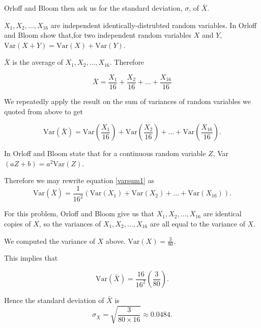 \documentclass[a4paper,11pt]{article}
\begin{document}
Orloff and Bloom then ask us for the
standard deviation, $\sigma$, of
$\bar{X}$.

$X_1, X_2, \ldots, X_16$ are independent identically-distrubted random
variables.  In \cite{reading6b} Orloff and Bloom show that,for two independent
random variables $X$ and $Y$, $\text{Var}\left( X + Y \right) =
\text{Var}\left( X \right) + \text{Var}\left( Y \right)$.

$\bar{X}$ is the average of $X_1, X_2, \ldots, X_16$.  Therefore

\begin{equation}
\bar{X} = \frac{X_1}{16} + \frac{X_2}{16} + \ldots + \frac{X_16}{16}
\end{equation}

We repeatedly apply the result on the sum of variances of random variables
we quoted from \cite{reading6b} above to get

\begin{equation} \label{varsum1}
\text{Var}\left(\bar{X}\right) = \text{Var}\left(\frac{X_1}{16}\right)
 + \text{Var}\left(\frac{X_2}{16}\right) + \ldots +
 \text{Var}\left(\frac{X_16}{16}\right).
\end{equation}

In \cite{reading6a} Orloff and Bloom state that for
a continuous random variable $Z$,
Var$\left(aZ + b \right)=a^2\text{Var}\left(Z\right)$.

Therefore we may rewrite equation \ref{varsum1} as
\begin{equation} \label{varsum2}
\text{Var}\left(\bar{X}\right) = \frac{1}{16^2}\left(\text{Var}\left(X_1\right)
 + \text{Var}\left(X_2\right) + \ldots +
 \text{Var}\left(X_16\right)\right).
\end{equation}

For this problem, Orloff and Bloom give us that
$X_1 , X_2 , \ldots , X_16$ are identical copies
of $X$, so the variances of $X_1 , X_2 , \ldots , X_16$
are all equal to the variance of $X$.

We computed the variance of $X$ above.
$\text{Var}\left(X \right)=\frac{3}{80}$.

This implies that

\begin{equation}
\text{Var}\left(\bar{X}\right) = \frac{16}{16^2}\left(\frac{3}{80}\right).
\end{equation}

Hence the standard deviation of $\bar{X}$ is
\begin{equation}
\sigma_{\bar{X}} = \sqrt{\frac{3}{80\times16}} \approx 0.0484.
\end{equation}
\end{document}
